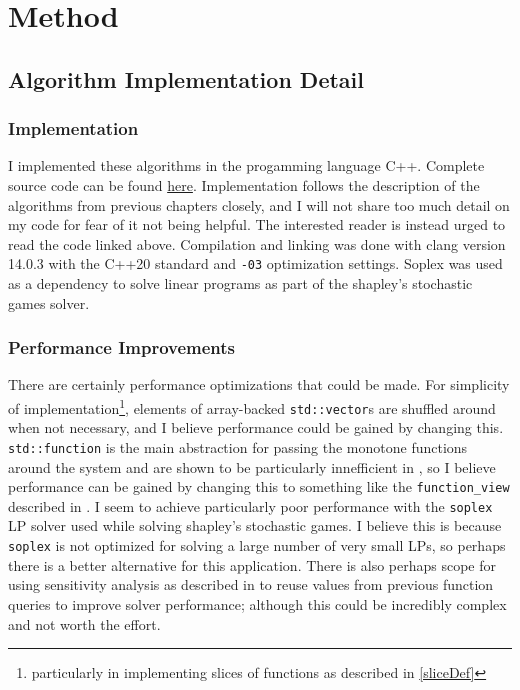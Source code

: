 \section{Method}
\subsection{Algorithm Implementation Detail}
\subsubsection{Implementation}
I implemented these algorithms in the progamming language C++. 
Complete source code can be found \href{https://github.com/angusjoshi/tarski}{here}.
Implementation follows the description of the algorithms from previous chapters closely,
and I will not share too much detail on my code for fear of it not being helpful. The interested
reader is instead urged to read the code linked above. Compilation and linking was done with
clang version 14.0.3 with the C++20 standard and \lstinline{-03} optimization settings.
Soplex\citep{soplex} was used as a dependency to solve linear programs
as part of the shapley's stochastic games solver.  \\
\subsubsection{Performance Improvements}
There are certainly performance optimizations that could be made. For simplicity of implementation\footnote{particularly
in implementing slices of functions as described in \cref{sliceDef}},
elements of array-backed \lstinline{std::vector}s are shuffled around when not necessary, and I believe
performance could be gained by changing this. \lstinline{std::function} is the main abstraction for passing
the monotone functions around the system and are shown to be particularly innefficient in \citep{stdFunctionBad},
so I believe performance can be gained by changing this to something like the \lstinline{function_view} described in \citep{stdFunctionBad}.
I seem to achieve particularly poor performance with the \lstinline{soplex} LP solver used while solving shapley's stochastic games.
I believe this is because \lstinline{soplex} is not optimized for solving a large number of very small LPs,
so perhaps there is a better alternative for this application. There is also perhaps scope for using sensitivity
analysis as described in \citep{sensAnalysis} to reuse values from previous function queries to improve
solver performance; although this could be incredibly complex and not worth the effort.

